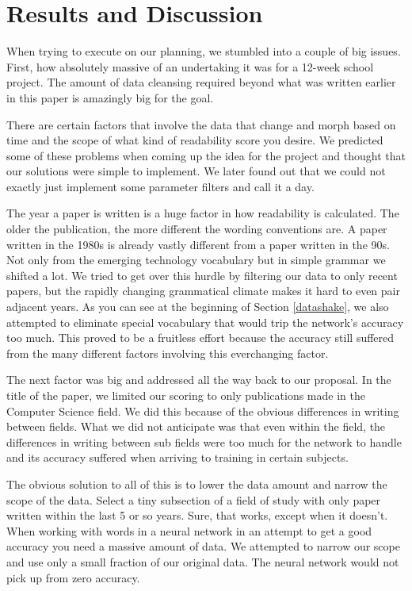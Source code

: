 \documentclass[conference]{IEEEtran}
\begin{document}
\section{Results and Discussion}
When trying to execute on our planning, we stumbled into a couple of big issues. First, how absolutely massive of an undertaking it was for a 12-week school project. The amount of data cleansing required beyond what was written earlier in this paper is amazingly big for the goal.
\par
There are certain factors that involve the data that change and morph based on time and the scope of what kind of readability score you desire. We predicted some of these problems when coming up the idea for the project and thought that our solutions were simple to implement. We later found out that we could not exactly just implement some parameter filters and call it a day.
\par
The year a paper is written is a huge factor in how readability is calculated. The older the publication, the more different the wording conventions are. A paper written in the 1980s is already vastly different from a paper written in the 90s. Not only from the emerging technology vocabulary but in simple grammar we shifted a lot. We tried to get over this hurdle by filtering our data to only recent papers, but the rapidly changing grammatical climate makes it hard to even pair adjacent years. As you can see at the beginning of Section \ref{datashake}, we also attempted to eliminate special vocabulary that would trip the network’s accuracy too much. This proved to be a fruitless effort because the accuracy still suffered from the many different factors involving this everchanging factor.
\par
The next factor was big and addressed all the way back to our proposal. In the title of the paper, we limited our scoring to only publications made in the Computer Science field. We did this because of the obvious differences in writing between fields. What we did not anticipate was that even within the field, the differences in writing between sub fields were too much for the network to handle and its accuracy suffered when arriving to training in certain subjects.
\par
The obvious solution to all of this is to lower the data amount and narrow the scope of the data. Select a tiny subsection of a field of study with only paper written within the last 5 or so years. Sure, that works, except when it doesn’t. When working with words in a neural network in an attempt to get a good accuracy you need a massive amount of data. We attempted to narrow our scope and use only a small fraction of our original data. The neural network would not pick up from zero accuracy. \\ \\
\end{document}
